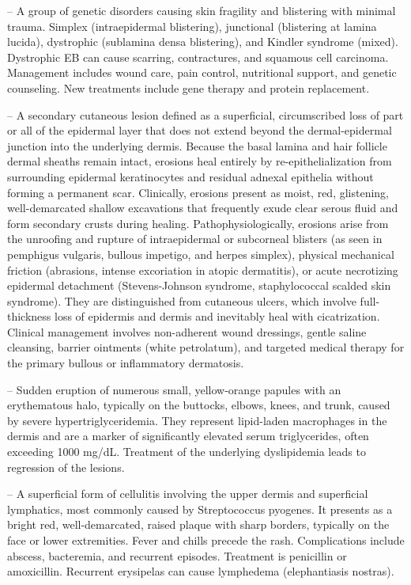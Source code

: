 -- A group of genetic disorders causing skin fragility and blistering with minimal trauma. Simplex (intraepidermal blistering), junctional (blistering at lamina lucida), dystrophic (sublamina densa blistering), and Kindler syndrome (mixed). Dystrophic EB can cause scarring, contractures, and squamous cell carcinoma. Management includes wound care, pain control, nutritional support, and genetic counseling. New treatments include gene therapy and protein replacement.

-- A secondary cutaneous lesion defined as a superficial, circumscribed loss of part or all of the epidermal layer that does not extend beyond the dermal-epidermal junction into the underlying dermis. Because the basal lamina and hair follicle dermal sheaths remain intact, erosions heal entirely by re-epithelialization from surrounding epidermal keratinocytes and residual adnexal epithelia without forming a permanent scar. Clinically, erosions present as moist, red, glistening, well-demarcated shallow excavations that frequently exude clear serous fluid and form secondary crusts during healing. Pathophysiologically, erosions arise from the unroofing and rupture of intraepidermal or subcorneal blisters (as seen in pemphigus vulgaris, bullous impetigo, and herpes simplex), physical mechanical friction (abrasions, intense excoriation in atopic dermatitis), or acute necrotizing epidermal detachment (Stevens-Johnson syndrome, staphylococcal scalded skin syndrome). They are distinguished from cutaneous ulcers, which involve full-thickness loss of epidermis and dermis and inevitably heal with cicatrization. Clinical management involves non-adherent wound dressings, gentle saline cleansing, barrier ointments (white petrolatum), and targeted medical therapy for the primary bullous or inflammatory dermatosis.

-- Sudden eruption of numerous small, yellow-orange papules with an erythematous halo, typically on the buttocks, elbows, knees, and trunk, caused by severe hypertriglyceridemia. They represent lipid-laden macrophages in the dermis and are a marker of significantly elevated serum triglycerides, often exceeding 1000 mg/dL. Treatment of the underlying dyslipidemia leads to regression of the lesions.

-- A superficial form of cellulitis involving the upper dermis and superficial lymphatics, most commonly caused by Streptococcus pyogenes. It presents as a bright red, well-demarcated, raised plaque with sharp borders, typically on the face or lower extremities. Fever and chills precede the rash. Complications include abscess, bacteremia, and recurrent episodes. Treatment is penicillin or amoxicillin. Recurrent erysipelas can cause lymphedema (elephantiasis nostras).

